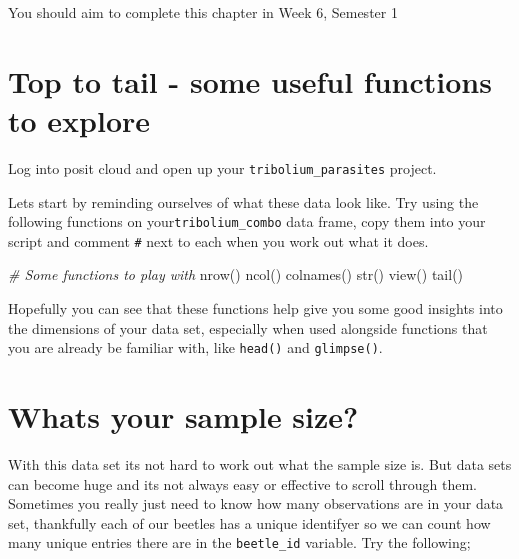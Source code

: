 \documentclass[
]{book}
\newenvironment{Shaded}{\begin{snugshade}}{\end{snugshade}}
\newcommand{\CommentTok}[1]{\textcolor[rgb]{0.56,0.35,0.01}{\textit{#1}}}
\newcommand{\FunctionTok}[1]{\textcolor[rgb]{0.00,0.00,0.00}{#1}}
\newcommand{\NormalTok}[1]{#1}
\newcommand{\SpecialCharTok}[1]{\textcolor[rgb]{0.00,0.00,0.00}{#1}}
\begin{document}
You should aim to complete this chapter in Week 6, Semester 1

\hypertarget{top-to-tail---some-useful-functions-to-explore}{%
\section{Top to tail - some useful functions to explore}\label{top-to-tail---some-useful-functions-to-explore}}

Log into posit cloud and open up your \texttt{tribolium\_parasites} project.

Lets start by reminding ourselves of what these data look like. Try using the following functions on your\texttt{tribolium\_combo} data frame, copy them into your script and comment \texttt{\#} next to each when you work out what it does.

\begin{Shaded}
\begin{Highlighting}[]
\CommentTok{\# Some functions to play with}
\FunctionTok{nrow}\NormalTok{()}
\FunctionTok{ncol}\NormalTok{()}
\FunctionTok{colnames}\NormalTok{()}
\FunctionTok{str}\NormalTok{()}
\FunctionTok{view}\NormalTok{()}
\FunctionTok{tail}\NormalTok{()}
\end{Highlighting}
\end{Shaded}

Hopefully you can see that these functions help give you some good insights into the dimensions of your data set, especially when used alongside functions that you are already be familiar with, like \texttt{head()} and \texttt{glimpse()}.

\hypertarget{whats-your-sample-size}{%
\section{Whats your sample size?}\label{whats-your-sample-size}}

With this data set its not hard to work out what the sample size is. But data sets can become huge and its not always easy or effective to scroll through them. Sometimes you really just need to know how many observations are in your data set, thankfully each of our beetles has a unique identifyer so we can count how many unique entries there are in the \texttt{beetle\_id} variable. Try the following;

\begin{Shaded}
\end{Shaded}
\end{document}
